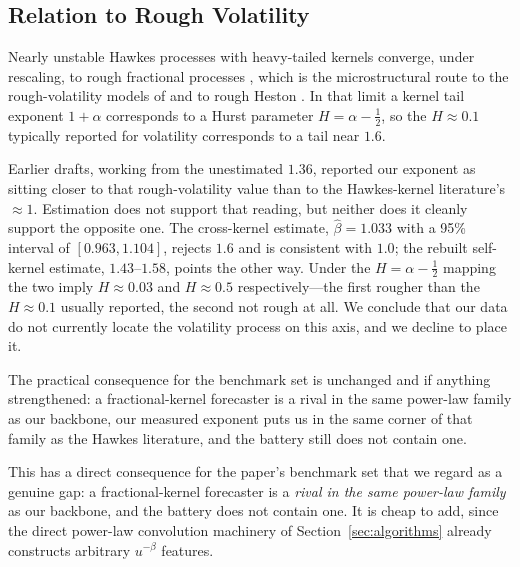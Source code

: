 \subsection{Relation to Rough Volatility}
\label{sec:rough}

Nearly unstable Hawkes processes with heavy-tailed kernels converge, under
rescaling, to rough fractional processes \citep{JaissonRosenbaum2016}, which is
the microstructural route to the rough-volatility models of
\citet{GatheralJaissonRosenbaum2018} and to rough Heston
\citep{ElEuchRosenbaum2019}. In that limit a kernel tail exponent $1+\alpha$
corresponds to a Hurst parameter $H = \alpha - \tfrac{1}{2}$, so the
$H \approx 0.1$ typically reported for volatility corresponds to a tail near
$1.6$.

Earlier drafts, working from the unestimated $1.36$, reported our exponent as
sitting closer to that rough-volatility value than to the Hawkes-kernel
literature's $\approx 1$. Estimation does not support that reading, but neither
does it cleanly support the opposite one. The cross-kernel estimate,
$\hat\beta = 1.033$ with a 95\% interval of $[0.963, 1.104]$, rejects $1.6$ and
is consistent with $1.0$; the rebuilt self-kernel estimate, $1.43$--$1.58$,
points the other way. Under the $H = \alpha - \tfrac{1}{2}$ mapping the two
imply $H \approx 0.03$ and $H \approx 0.5$ respectively---the first rougher
than the $H \approx 0.1$ usually reported, the second not rough at all. We
conclude that our data do not currently locate the volatility process on this
axis, and we decline to place it.

The practical consequence for the benchmark set is unchanged and if anything
strengthened: a fractional-kernel forecaster is a rival in the same power-law
family as our backbone, our measured exponent puts us in the same corner of
that family as the Hawkes literature, and the battery still does not contain
one. 

This has a direct consequence for the paper's benchmark set that we regard as
a genuine gap: a fractional-kernel forecaster is a \emph{rival in the same
power-law family} as our backbone, and the battery does not contain one. It is
cheap to add, since the direct power-law convolution machinery of
Section~\ref{sec:algorithms} already constructs arbitrary $u^{-\beta}$ features.

